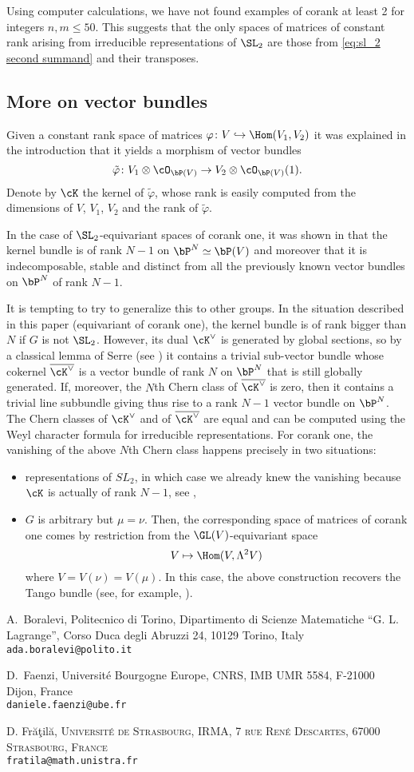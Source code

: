 \documentclass[reqno, 10pt]{amsart}
\makeatletter
\theoremstyle{plain}
\theoremstyle{definition}
\newcounter{daniele}
\newcounter{ada}
\newcommand{\Addresses}{{%
		\bigskip
		\footnotesize
		A.~Boralevi, Politecnico di Torino, Dipartimento di Scienze Matematiche ``G. L. Lagrange'', 
		Corso Duca degli Abruzzi 24, 10129 Torino, Italy 
		\\ \nopagebreak
		\texttt{ada.boralevi@polito.it}

		\medskip
		\noindent D.~Faenzi, 
                Université Bourgogne Europe, CNRS, IMB UMR 5584,
                F-21000 Dijon, France 
                \\ \nopagebreak
		\texttt{daniele.faenzi@ube.fr}

		\medskip
		\noindent D. Fr\u{a}\c{t}il\u{a}, \textsc{Université de Strasbourg, IRMA, 7 rue René Descartes, 67000 Strasbourg, France}\\\nopagebreak
		\texttt{fratila@math.unistra.fr}
}}
\numberwithin{equation}{section}%
\makeatother
\begin{document}
Using computer calculations, we have not found examples of corank at least 2 for integers $n,m\le 50$. 
This suggests that the only spaces of matrices of constant rank arising from irreducible representations of $\SL_2$ are those from \eqref{eq:sl_2 second summand} and their transposes.

\subsection{More on vector bundles}
Given a constant rank space of matrices $\varphi\colon V\hookrightarrow\Hom(V_1,V_2)$ it was explained in the introduction that it yields a morphism of vector bundles 
\[ \tilde\varphi\colon V_1\otimes\cO_{\bP(V)}\to V_2\otimes\cO_{\bP(V)}(1).\]
Denote by $\cK$ the kernel of $\tilde\varphi$, whose rank is easily computed from the dimensions of $V$, $V_1$, $V_2$ and the rank of $\tilde\varphi$.

In the case of $\SL_2$-equivariant spaces of corank one, it was shown in \cite{BFL2} that the kernel bundle is of rank $N-1$ on $\bP^N\simeq \bP(V)$ and moreover that it is indecomposable, stable and distinct from all the previously known vector bundles on $\bP^N$ of rank $N-1$.

\medskip
It is tempting to try to generalize this to other groups.
In the situation described in this paper (equivariant of corank one),
the kernel bundle is of rank bigger than $N$ if $G$ is not $\SL_2$. 
However, its dual
$\cK^\vee$ is generated by global sections, so by a classical lemma of
Serre (see \cite[Lemma 4.3.1]{OSS}) it contains a trivial sub-vector bundle whose cokernel $\overline{\cK^\vee}$ is a vector bundle of rank $N$ on $\bP^N$ that is still globally generated.
If, moreover, the $N$th Chern class of $\overline{\cK^\vee}$ is zero, then it contains a trivial line subbundle giving thus rise to a rank $N-1$ vector bundle on $\bP^N$.
The Chern classes of $\cK^\vee$ and of $\overline{\cK^\vee}$ are equal and can be computed using the Weyl character formula for irreducible representations. For corank one, the vanishing of the above $N$th Chern class happens precisely in two situations: 
\begin{itemize}
	\item representations of $SL_2$, in which case we already knew the vanishing because $\cK$ is actually of rank $N-1$, see \cite{BFL2},
	\item $G$ is arbitrary but $\mu=\nu$. Then, the corresponding space of matrices of corank one comes by restriction from the $\GL(V)$-equivariant space 
	\[ V\mapsto \Hom(V, \Lambda^2 V)\]
	where $V=V(\nu)=V(\mu)$. In this case, the above construction recovers the Tango bundle (see, for example, \cite[Theorem 4.3.3]{OSS}).
\end{itemize}
	

	
\Addresses

	
\end{document}
